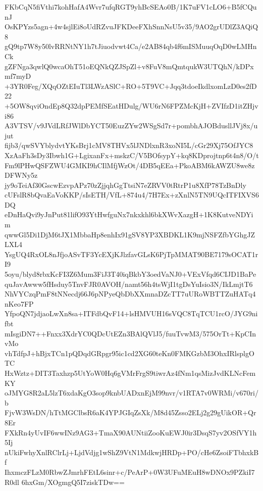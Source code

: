 FKbCqN5fiVthi7kohHafA4Wvr7ufqRGT9yhBcSEAo0B/1K7uFV1cLO6+B5fCQunJ
OsKPYzs5agn+4w4sjlEi8oUdRZvuJFKDeeFXhSnnNsU5v35/9AO2grUDlZ3AQiQ8
gQ9tp7W8y50lvRRNtNY1h7tJiuodvwt4Ca/e2AB84qb4f6mISMuuqOqD0wLMHnCk
gZFNga3qwlQ0wcaOhT51oEQNkQZJSpZl+v8FuV8mQmtqukW3UTQhN/kDPxmf7myD
+3YR0Feg/XQqOZtEIuTl3LWzASlC+RO+5T9VC+Jqq3tdoeIkdlxomLzD0es2fD22
+5OW8qviOndEp8Q32dpPEMfSEatHDulg/WU6rN6FPZMcKjH+ZVIfzD1itZHjvi86
A3VTSV/v9JVdLRfJWlDbYCT50EuzZYw2WSgSd7r+pombhAJOBdusllJVj8x/ujut
fijb3/qwSVYblydvtYKsBrj1cMV8THVx5lJNDlxnR3xoNI5L/cGr29Xj75OfJYC8
XzAaFh3sDy3Ibwh1G+LgixanFx+mskzC/V5BOfsypY+kq8KDprojtnp6t4n8/O/t
Fm9lPHwQSFZWU4GMKI9hCIlMfjWzOt/4DB5qEEa+PkoABM6kAWZU8we8zDFWNy5z
jy9oTeiAf30GscwEzvpAPz70zZjjqhGgTtsiN7eZRVV0tRtrP1u8XfP78TzBnDly
cUFslR8bQvaEaVoKKP/sIsETH/VfL+874u4/7H7Ex+zXnlN5TN9UQcITFIXVS6DQ
eDnHaQvi9yJnPut81lifO93YtHwfguNx7nkxkhl6bkXWvXazgH+1K8KutveNDYim
qwwGl5Di1DjM6tJX1MbbaHp8enhIx91gSV8YP3XBDKL1K9mjNSFZfbYGhgJZLXL4
YsgUQ4RxOL8nJfjoASvTF3YcEXjKJlzfavGLsK6PjTpMMAT90BE7179sOCAT1rI9
5oyu/blyd8rbxKcFI3Z6Mum3FiJ3T40iqBkbY3oedVaNJ0+VExVfqd6CIJD1BaPe
quJavAwww5fHsduy5TnvFJR0AVOH/namt56h4tsWjI1tgDsYuIsio3N/IkLmjtT6
NhVYCzqPmF8tNNecdj66J6pNPyeQbDbXXmnaDZcTT7uURoWBTTZuHATq4nKeo7FP
YfpoQN7jdjaoLwXn8sa+ITFdbQvF14+lsHMVUH16sVQC8TqTCU1rcO/JYG9nifbt
mIsgiDN7++Fnxx3XdrYC0QDcUtEZn3BAlQVlJ5/fuuTvwM3/575OrTt+KpCInvMo
vhTdfpJ+hBjxTCn1pQDqdGRpgr95ic1cd2XG60teKn0FMKGzbM3OhxIRlsplgOTC
HxWztz+DIT3Taxhzp5UtYoW0Hq6gVMrFrgS9tiwrAz4fNm1qsMizJvdKLNcFemKY
oJMYG8R2aL5lzT6xdaKgO3sop9knbUADxnEjM99nvr/v1RTA7v0WRMi/v670ri/b
FjvW3WsDN/hTtMGClbsR6aK4YPJGIqZsXk/M8d45Zsso2ELj2g29gUikOR+Qr8Er
FXkRn4yUvIF6wwINz9AG3+TmaX90AUNtiiZooKuEWJ0ir3DsqS7yv2OSfVY1h5Ij
nUkiFwhyXnlRClrLj+LjdVdjg1wShZ9VtN1MdkwjHRDp+PO/cHe6ZsoiFTbhxkBf
IhxmczFLzM0RbwZJmrhFEtL6sinr+c/PeArP+0W3UFuMEuH8wDNOx9PZkiI7R0dl
6hxGm/XOgmgQ5I7ziskTDw==
